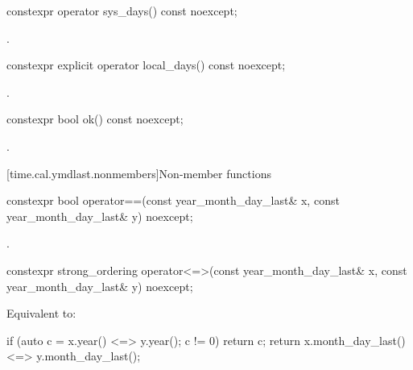 %
\begin{itemdecl}
constexpr operator sys_days() const noexcept;
\end{itemdecl}

\begin{itemdescr}
\pnum
\returns
{}.
\end{itemdescr}

%
\begin{itemdecl}
constexpr explicit operator local_days() const noexcept;
\end{itemdecl}

\begin{itemdescr}
\pnum
\returns
{}.
\end{itemdescr}

%
\begin{itemdecl}
constexpr bool ok() const noexcept;
\end{itemdecl}

\begin{itemdescr}
\pnum
\returns
{}.
\end{itemdescr}

[time.cal.ymdlast.nonmembers]{Non-member functions}

%
\begin{itemdecl}
constexpr bool operator==(const year_month_day_last& x, const year_month_day_last& y) noexcept;
\end{itemdecl}

\begin{itemdescr}
\pnum
\returns
{}.
\end{itemdescr}

%
\begin{itemdecl}
constexpr strong_ordering operator<=>(const year_month_day_last& x,
                                      const year_month_day_last& y) noexcept;
\end{itemdecl}

\begin{itemdescr}
\pnum
\effects
Equivalent to:
\begin{codeblock}
if (auto c = x.year() <=> y.year(); c != 0) return c;
return x.month_day_last() <=> y.month_day_last();
\end{codeblock}
\end{itemdescr}

